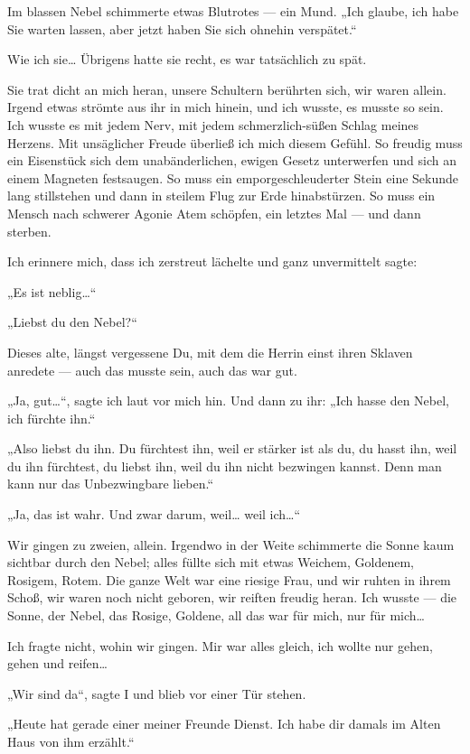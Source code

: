 Im
blassen Nebel schimmerte etwas Blutrotes — ein Mund. „Ich glaube,
ich habe Sie warten lassen, aber jetzt haben Sie sich ohnehin
verspätet.“

Wie ich sie\ldots{} Übrigens hatte sie recht, es war tatsächlich zu
spät.

Sie trat dicht an mich heran, unsere Schultern berührten sich, wir
waren allein. Irgend etwas strömte aus ihr in mich hinein, und ich
wusste, es musste so sein. Ich wusste es mit jedem Nerv, mit jedem
schmerzlich-süßen Schlag meines Herzens. Mit unsäglicher Freude
überließ ich mich diesem Gefühl. So freudig muss ein Eisenstück
sich dem unabänderlichen, ewigen Gesetz unterwerfen und sich an
einem Magneten festsaugen. So muss ein emporgeschleuderter Stein
eine Sekunde lang stillstehen und dann in steilem Flug zur Erde
hinabstürzen. So muss ein Mensch nach schwerer Agonie Atem
schöpfen, ein letztes Mal — und dann sterben.

Ich erinnere mich, dass ich zerstreut lächelte und ganz
unvermittelt sagte:

„Es ist neblig\ldots{}“

„Liebst du den Nebel?“

Dieses alte, längst vergessene Du, mit dem die Herrin einst ihren
Sklaven anredete — auch das musste sein, auch das war gut.

„Ja, gut\ldots{}“, sagte ich laut vor mich hin. Und dann zu ihr: „Ich
hasse den Nebel, ich fürchte ihn.“

„Also liebst du ihn. Du
fürchtest ihn, weil er stärker ist als du, du hasst ihn, weil du
ihn fürchtest, du liebst ihn, weil du ihn nicht bezwingen kannst.
Denn man kann nur das Unbezwingbare lieben.“

„Ja, das ist wahr. Und zwar darum, weil\ldots{} weil ich\ldots{}“

Wir gingen
zu zweien, allein. Irgendwo in der Weite schimmerte die Sonne kaum
sichtbar durch den Nebel; alles füllte sich mit etwas Weichem,
Goldenem, Rosigem, Rotem. Die ganze Welt war eine riesige Frau, und
wir ruhten in ihrem Schoß, wir waren noch nicht geboren, wir
reiften freudig heran. Ich wusste — die Sonne, der Nebel, das
Rosige, Goldene, all das war für mich, nur für mich\ldots{}

Ich fragte nicht, wohin wir gingen. Mir war alles gleich, ich
wollte nur gehen, gehen und reifen\ldots{}

„Wir sind da“, sagte I und blieb vor einer Tür stehen.

„Heute hat gerade einer meiner Freunde
Dienst. Ich habe dir damals im Alten Haus von ihm erzählt.“

